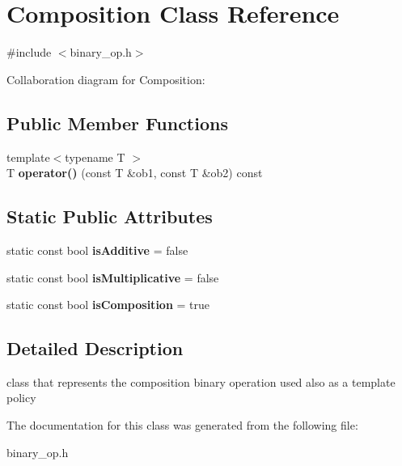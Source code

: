 \hypertarget{classComposition}{\section{Composition Class Reference}
\label{classComposition}
}


{\ttfamily \#include $<$binary\-\_\-op.\-h$>$}



Collaboration diagram for Composition\-:
\subsection*{Public Member Functions}
\begin{DoxyCompactItemize}
\item 
\hypertarget{classComposition_a048fe922128d64e0ac28f59ee3dd6206}{{\footnotesize template$<$typename T $>$ }\\T {\bfseries operator()} (const T \&ob1, const T \&ob2) const }\label{classComposition_a048fe922128d64e0ac28f59ee3dd6206}

\end{DoxyCompactItemize}
\subsection*{Static Public Attributes}
\begin{DoxyCompactItemize}
\item 
\hypertarget{classComposition_a3a184cd6b55d3e5cf4f86868d3350c89}{static const bool {\bfseries is\-Additive} = false}\label{classComposition_a3a184cd6b55d3e5cf4f86868d3350c89}

\item 
\hypertarget{classComposition_a4092be14bb95792e50a3670e46455b58}{static const bool {\bfseries is\-Multiplicative} = false}\label{classComposition_a4092be14bb95792e50a3670e46455b58}

\item 
\hypertarget{classComposition_ad088137e0a459dadd3a3c5b89ecdf1d1}{static const bool {\bfseries is\-Composition} = true}\label{classComposition_ad088137e0a459dadd3a3c5b89ecdf1d1}

\end{DoxyCompactItemize}


\subsection{Detailed Description}
class that represents the composition binary operation used also as a template policy 

The documentation for this class was generated from the following file\-:\begin{DoxyCompactItemize}
\item 
binary\-\_\-op.\-h\end{DoxyCompactItemize}
